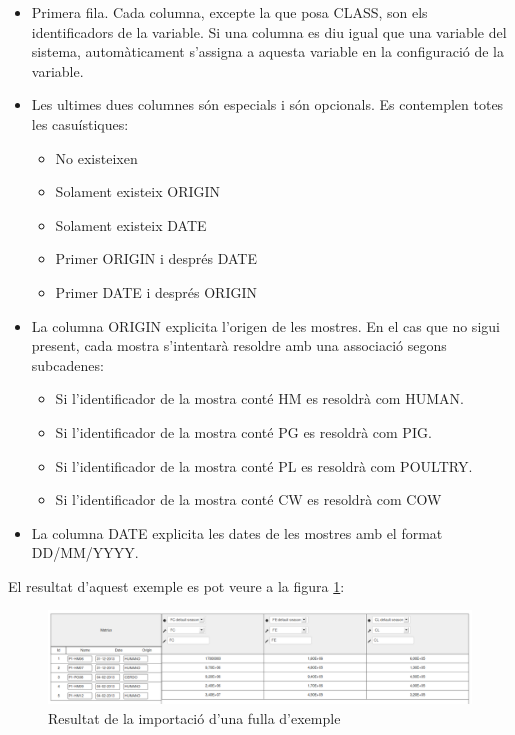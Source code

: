 \begin{itemize}
\item Primera fila. Cada columna, excepte la que posa CLASS, son els identificadors de la variable. Si una columna es diu igual que una variable del sistema, automàticament s'assigna a aquesta variable en la configuració de la variable.
\item Les ultimes dues columnes s\'{o}n especials i s\'{o}n opcionals. Es contemplen totes les casuístiques:
\begin{itemize}
\item No existeixen
\item Solament existeix ORIGIN
\item Solament existeix DATE
\item Primer ORIGIN i després DATE
\item Primer DATE i després ORIGIN
\end{itemize}
\item La columna ORIGIN explicita l'origen de les mostres. En el cas que no sigui present, cada mostra s'intentar\`{a} resoldre amb una associació segons subcadenes:
\begin{itemize}
\item Si l'identificador de la mostra cont\'{e} HM es resoldrà com HUMAN.
\item Si l'identificador de la mostra cont\'{e} PG es resoldrà com PIG.
\item Si l'identificador de la mostra cont\'{e} PL es resoldrà com POULTRY.
\item Si l'identificador de la mostra cont\'{e} CW es resoldrà com COW
\end{itemize}
\item La columna DATE explicita les dates de les mostres amb el format DD/MM/YYYY.
\end{itemize}

El resultat d'aquest exemple es pot veure a la figura \ref{fig:matrixResulting}:
\begin{figure}[h!]
  \centering
  \includegraphics[scale=0.3]{img/userguide/matrix_resulting.png}
  \caption{Resultat de la importació d'una fulla d'exemple}
  \label{fig:matrixResulting}
\end{figure}

